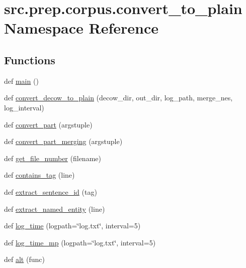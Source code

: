 \hypertarget{namespacesrc_1_1prep_1_1corpus_1_1convert__to__plain}{}\section{src.\+prep.\+corpus.\+convert\+\_\+to\+\_\+plain Namespace Reference}
\label{namespacesrc_1_1prep_1_1corpus_1_1convert__to__plain}
\subsection*{Functions}
\begin{DoxyCompactItemize}
\item 
def \hyperlink{namespacesrc_1_1prep_1_1corpus_1_1convert__to__plain_a99ae7c969ae720b7e9f57179fd8e1ec4}{main} ()
\item 
def \hyperlink{namespacesrc_1_1prep_1_1corpus_1_1convert__to__plain_a5c4557e99755aa707fe4f9e695730e1e}{convert\+\_\+decow\+\_\+to\+\_\+plain} (decow\+\_\+dir, out\+\_\+dir, log\+\_\+path, merge\+\_\+nes, log\+\_\+interval)
\item 
def \hyperlink{namespacesrc_1_1prep_1_1corpus_1_1convert__to__plain_a92e59756766fa41c157b3e17ac937638}{convert\+\_\+part} (argstuple)
\item 
def \hyperlink{namespacesrc_1_1prep_1_1corpus_1_1convert__to__plain_a6ca25a97378c6b72bb50992f78ceb746}{convert\+\_\+part\+\_\+merging} (argstuple)
\item 
def \hyperlink{namespacesrc_1_1prep_1_1corpus_1_1convert__to__plain_ab97b9ebe84880d79df0095fd217d346d}{get\+\_\+file\+\_\+number} (filename)
\item 
def \hyperlink{namespacesrc_1_1prep_1_1corpus_1_1convert__to__plain_a3e59673b0ebda3056f98253f642c4802}{contains\+\_\+tag} (line)
\item 
def \hyperlink{namespacesrc_1_1prep_1_1corpus_1_1convert__to__plain_a565357b326044658e51670634910db6c}{extract\+\_\+sentence\+\_\+id} (tag)
\item 
def \hyperlink{namespacesrc_1_1prep_1_1corpus_1_1convert__to__plain_a1f5a68f5115a67524fccea196f811d8b}{extract\+\_\+named\+\_\+entity} (line)
\item 
def \hyperlink{namespacesrc_1_1prep_1_1corpus_1_1convert__to__plain_a7aee1051947862de9b9d270e0deca725}{log\+\_\+time} (logpath=\char`\"{}log.\+txt\char`\"{}, interval=5)
\item 
def \hyperlink{namespacesrc_1_1prep_1_1corpus_1_1convert__to__plain_ac54572ac988eee3cb5795209152bd459}{log\+\_\+time\+\_\+mp} (logpath=\char`\"{}log.\+txt\char`\"{}, interval=5)
\item 
def \hyperlink{namespacesrc_1_1prep_1_1corpus_1_1convert__to__plain_afc6015c0a617e215e0979a965327db76}{alt} (func)
\end{DoxyCompactItemize}


